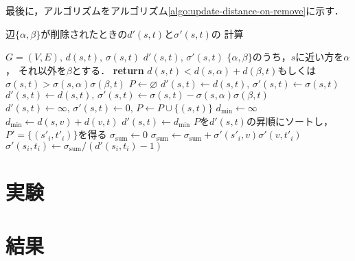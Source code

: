 最後に，アルゴリズムをアルゴリズム\ref{algo:update-distance-on-remove}に示す．
\begin{algorithm}
  \caption{辺$\{\alpha,\beta\}$が削除されたときの$d'(s,t)$と$\sigma'(s,t)$の
  計算}\label{algo:update-distance-on-remove}
  \begin{algorithmic}[1]
    \Require $G=(V,E),\,d(s,t),\,\sigma(s,t)$
    \Ensure $d'(s,t),\,\sigma'(s,t)$
    \State $\{\alpha,\beta\}$のうち，$s$に近い方を$\alpha$，
    それ以外を$\beta$とする．
    \State \textbf{return} $d(s,t)<d(s,\alpha)+d(\beta,t)$もしくは
    $\sigma(s,t)>\sigma(s,\alpha)\sigma(\beta,t)$
    \EndProcedure
    \State $P\gets\varnothing$
    \State $d'(s,t)\gets d(s,t),\,\sigma'(s,t)\gets\sigma(s,t)$
    \State $d'(s,t)\gets d(s,t),\,\sigma'(s,t)\gets\sigma(s,t)
    -\sigma(s,\alpha)\sigma(\beta,t)$
    \Else{}
    \State $d'(s,t)\gets\infty,\,\sigma'(s,t)\gets0,\,P\gets P\cup\{(s,t)\}$
    \EndIf
    \EndFor
    \State $d_{\min}\gets\infty$
    \State $d_{\min}\gets d(s,v)+d(v,t)$
    \EndIf
    \EndIf
    \EndFor
    \State $d'(s,t)\gets d_{\min}$
    \EndFor
    \State $P$を$d'(s,t)$の昇順にソートし，$P'=\{(s'_i,t'_i)\}$を得る
    \State $\sigma_{\mathrm{sum}}\gets0$
    \State $\sigma_{\mathrm{sum}}\gets
    \sigma_{\mathrm{sum}}+\sigma'(s'_i,v)\sigma'(v,t'_i)$
    \EndIf
    \EndFor
    \State $\sigma'(s_i,t_i)\gets\sigma_{\mathrm{sum}}/(d'(s_i,t_i)-1)$
    \EndFor
    \EndProcedure
  \end{algorithmic}
\end{algorithm}

\section{実験}
\label{sect:exp-faster-min-max}

\section{結果}
\label{sect:result-faster-min-max}

